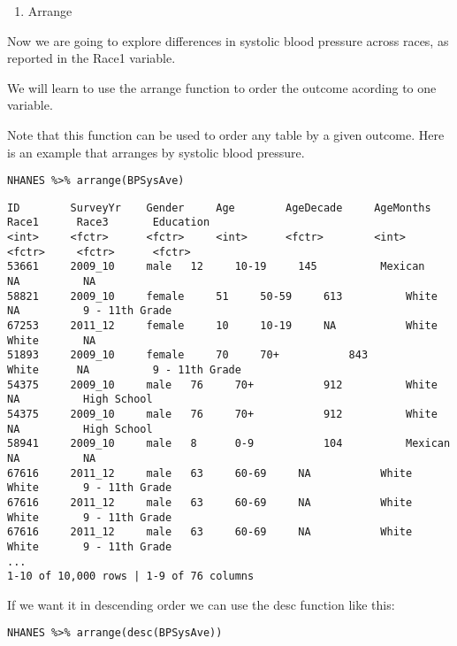 \documentclass[]{article}
\providecommand{\tightlist}{%
  \setlength{\itemsep}{0pt}\setlength{\parskip}{0pt}}
\begin{document}
\begin{enumerate}
\def\labelenumi{\arabic{enumi}.}
\setcounter{enumi}{7}
\tightlist
\item
  Arrange
\end{enumerate}

Now we are going to explore differences in systolic blood pressure
across races, as reported in the Race1 variable.

We will learn to use the arrange function to order the outcome acording
to one variable.

Note that this function can be used to order any table by a given
outcome. Here is an example that arranges by systolic blood pressure.

\begin{verbatim}
NHANES %>% arrange(BPSysAve)
\end{verbatim}

\begin{verbatim}
ID        SurveyYr    Gender     Age        AgeDecade     AgeMonths    Race1      Race3       Education
<int>     <fctr>      <fctr>     <int>      <fctr>        <int>        <fctr>     <fctr>      <fctr>
53661     2009_10     male   12     10-19     145          Mexican    NA          NA    
58821     2009_10     female     51     50-59     613          White      NA          9 - 11th Grade    
67253     2011_12     female     10     10-19     NA           White      White       NA    
51893     2009_10     female     70     70+           843          White      NA          9 - 11th Grade    
54375     2009_10     male   76     70+           912          White      NA          High School   
54375     2009_10     male   76     70+           912          White      NA          High School   
58941     2009_10     male   8      0-9           104          Mexican    NA          NA    
67616     2011_12     male   63     60-69     NA           White      White       9 - 11th Grade    
67616     2011_12     male   63     60-69     NA           White      White       9 - 11th Grade    
67616     2011_12     male   63     60-69     NA           White      White       9 - 11th Grade    
...
1-10 of 10,000 rows | 1-9 of 76 columns
\end{verbatim}

If we want it in descending order we can use the desc function like
this:

\begin{verbatim}
NHANES %>% arrange(desc(BPSysAve))
\end{verbatim}
\end{document}
